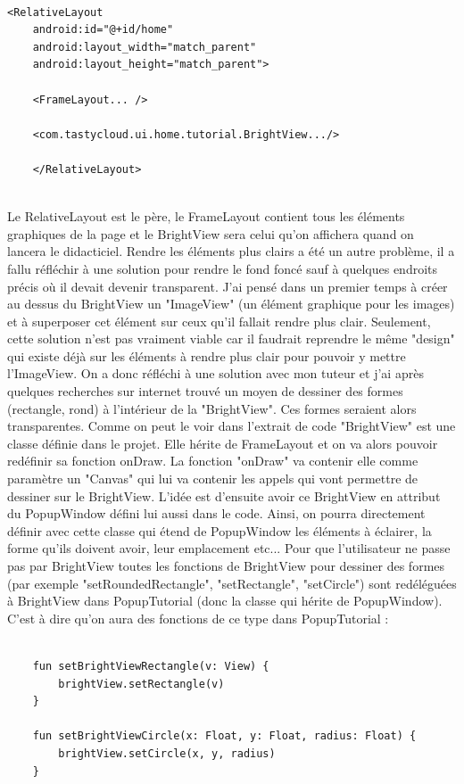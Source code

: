 \begin{lstlisting}[frame=single]  % Start your code-block
    
<RelativeLayout
    android:id="@+id/home"
    android:layout_width="match_parent"
    android:layout_height="match_parent">
    
    <FrameLayout... />
    
    <com.tastycloud.ui.home.tutorial.BrightView.../>
    
    </RelativeLayout>
    
\end{lstlisting}

Le RelativeLayout est le père, le FrameLayout contient tous les éléments graphiques de la page et le BrightView sera celui qu'on affichera quand on lancera le didacticiel. Rendre les éléments plus clairs a été un autre problème, il a fallu réfléchir à une solution pour rendre le fond foncé sauf à quelques endroits précis où il devait devenir transparent. J'ai pensé dans un premier temps à créer au dessus du BrightView un "ImageView" (un élément graphique pour les images) et à superposer cet élément sur ceux qu'il fallait rendre plus clair. Seulement, cette solution n'est pas vraiment viable car il faudrait reprendre le même "design" qui existe déjà sur les éléments à rendre plus clair pour pouvoir y mettre l'ImageView. On a donc réfléchi à une solution avec mon tuteur et j'ai après quelques recherches sur internet trouvé un moyen de dessiner des formes (rectangle, rond) à l'intérieur de la "BrightView". Ces formes seraient alors transparentes. Comme on peut le voir dans l'extrait de code "BrightView" est une classe définie dans le projet. Elle hérite de FrameLayout et on va alors pouvoir redéfinir sa fonction onDraw. La fonction "onDraw" va contenir elle comme paramètre un "Canvas" qui lui va contenir les appels qui vont permettre de dessiner sur le BrightView. L'idée est d'ensuite avoir ce BrightView en attribut du PopupWindow défini lui aussi dans le code. Ainsi, on pourra directement définir avec cette classe qui étend de PopupWindow les éléments à éclairer, la forme qu'ils doivent avoir, leur emplacement etc... Pour que l'utilisateur ne passe pas par BrightView toutes les fonctions de BrightView pour dessiner des formes (par exemple "setRoundedRectangle", "setRectangle", "setCircle") sont redéléguées à BrightView dans PopupTutorial (donc la classe qui hérite de PopupWindow). C'est à dire qu'on aura des fonctions de ce type dans PopupTutorial :

\begin{lstlisting}[frame=single]  % Start your code-block
    
    fun setBrightViewRectangle(v: View) {
        brightView.setRectangle(v)
    }
    
    fun setBrightViewCircle(x: Float, y: Float, radius: Float) {
        brightView.setCircle(x, y, radius)
    }
    
\end{lstlisting}

